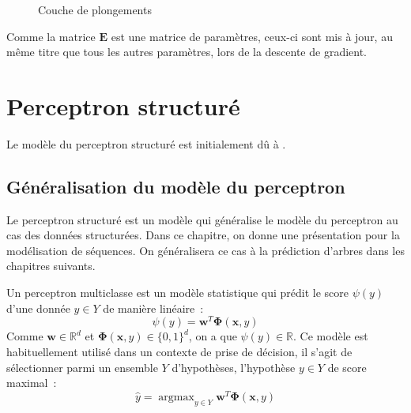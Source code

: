 \documentclass[11pt,openany]{book}
\begin{document}
\begin{figure}
\caption{\label{fig-embedding} Couche de plongements}
\end{figure}
 
Comme la matrice $\mathbf{E}$ est une matrice de paramètres,
ceux-ci sont mis à jour, au même titre que tous les autres paramètres,
 lors de la descente de gradient.









\chapter{Perceptron structuré}

Le modèle du perceptron structuré est initialement dû à \cite{collins-2002}.

\section{Généralisation du modèle du perceptron}

Le perceptron structuré est un modèle qui généralise le modèle du
perceptron au cas des données structurées. 
Dans ce chapitre, on donne une présentation pour la modélisation de
séquences. On généralisera ce cas à la prédiction d'arbres dans les
chapitres suivants.

Un perceptron multiclasse est un modèle statistique qui prédit le
score $\psi(y)$ d'une donnée $y\in Y$ de manière linéaire~:
\begin{equation}
\psi(y) = \mathbf{w}^T \boldsymbol\Phi(\mathbf{x},y)
\end{equation}
Comme $\mathbf{w} \in \mathbb{R}^d$ et $\boldsymbol\Phi(\mathbf{x},y)
\in \{0,1\}^d$, on a que $\psi(y) \in \mathbb{R}$. 
Ce modèle est habituellement utilisé dans un contexte de prise de
décision, il s'agit de sélectionner parmi un ensemble $Y$ d'hypothèses, 
l'hypothèse $y\in Y$ de score maximal~:
\begin{equation}
\hat{y} =   \mathop{\text{argmax}}_{y\in Y} \mathbf{w}^T \boldsymbol\Phi(\mathbf{x},y)
\end{equation}
\end{document}
